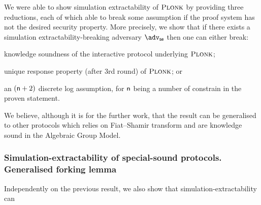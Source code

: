 \documentclass[runningheads,11pt]{llncs}
\begin{document}
	We were able to show simulation extractability of $\textsc{Plonk}$ by providing three reductions, each of which able to break some assumption if the proof system has not the desired security property. 
	More precisely, we show that if there exists a simulation extractability-breaking adversary $\advse$ then one can either break: 
	\begin{compactenum}
		\item \label{it:ks} knowledge soundness of the interactive protocol underlying $\textsc{Plonk}$; 
		\item \label{it:dlog} unique response property (after $3$rd round) of $\textsc{Plonk}$; or 
		\item \label{it:ur} an $(\mathsf{n} + 2)$ discrete log assumption, for $\mathsf{n}$ being a number of constrain in the proven statement.
	\end{compactenum}
	
	\medskip
	We believe, although it is for the further work, that the result can be generalised to other protocols which relies on Fiat--Shamir transform and are knowledge sound in the Algebraic Group Model.
	
	\subsubsection*{Simulation-extractability of special-sound protocols. Generalised forking lemma}
	Independently on the previous result, we also show that simulation-extractability can 
	
	
	
\end{document}
